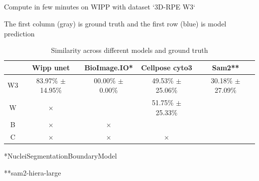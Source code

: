 \subsection{\slidetitle}
\begin{frame}
  \frametitle{\sectiontitle}
  \framesubtitle{\slidetitle}

  Compute in few minutes on WIPP with dataset `3D-RPE W3`

  The first column (gray) is ground truth and the first row (blue) is model prediction

  \begin{center}
    \begin{table}
      \begin{tabular}{|c|c|c|c|c|}
       \hline
       \rowcolor{tableFirstRowColor}      & Wipp unet             & BioImage.IO*          & Cellpose cyto3        & Sam2**   \\ [0.5ex]
       \hline
       \cellcolor{tableFirstColColor} W3  & 83.97\% $\pm$ 14.95\% & 00.00\% $\pm$ 0.00\%  & 49.53\% $\pm$ 25.06\% & 30.18\% $\pm$ 27.09\% \\
       \hline
       \cellcolor{tableFirstColColor} W   & $\times$              &                       & 51.75\% $\pm$ 25.33\% & \\
       \hline
       \cellcolor{tableFirstColColor} B   & $\times$              & $\times$              &                       & \\
       \hline
       \cellcolor{tableFirstColColor} C   & $\times$              & $\times$              & $\times$              & \\
       \hline
      \end{tabular}
      \caption{Similarity across different models and ground truth}
    \end{table}
  \end{center}

  *NucleiSegmentationBoundaryModel

  **sam2-hiera-large

\end{frame}
